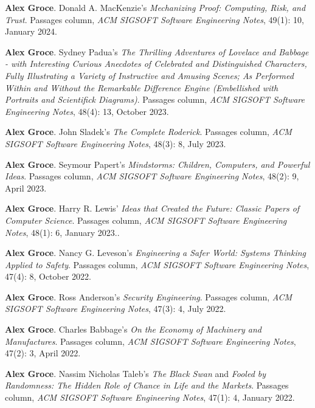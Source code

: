 \documentclass[ComputerScience]{vita}
\begin{document}
\begin{vita}
\begin{Columns, Book Reviews, and Magazine Articles}
\item {\bf Alex Groce}.
  \newblock Donald A. MacKenzie's \emph{Mechanizing Proof: Computing, Risk, and Trust}.
  \newblock Passages column, \emph{ACM SIGSOFT Software Engineering 
  Notes}, 49(1): 10, January 2024.
  
\item {\bf Alex Groce}.
  \newblock Sydney Padua's \emph{The Thrilling Adventures of Lovelace and Babbage - with Interesting Curious Anecdotes of Celebrated and Distinguished Characters, Fully Illustrating a Variety of Instructive and Amusing Scenes; As Performed Within and Without the Remarkable Difference Engine (Embellished with Portraits and Scientifick Diagrams)}.
  \newblock Passages column, \emph{ACM SIGSOFT Software Engineering 
  Notes}, 48(4): 13, October 2023.
  
\item {\bf Alex Groce}.
  \newblock John Sladek's \emph{The Complete Roderick}.
  \newblock Passages column, \emph{ACM SIGSOFT Software Engineering 
  Notes}, 48(3): 8, July 2023.

\item {\bf Alex Groce}. 
\newblock Seymour Papert's \emph{Mindstorms: Children, Computers, and Powerful Ideas}.
\newblock Passages column, \emph{ACM SIGSOFT Software Engineering 
  Notes}, 48(2): 9, April 2023.
  
\item {\bf Alex Groce}. 
\newblock Harry R. Lewis' \emph{Ideas that Created the Future: Classic Papers of Computer Science}.
\newblock Passages column, \emph{ACM SIGSOFT Software Engineering 
  Notes}, 48(1): 6, January 2023..
  
\item {\bf Alex Groce}. 
\newblock Nancy G. Leveson's \emph{Engineering a Safer World: Systems Thinking Applied to Safety}. 
\newblock Passages column, \emph{ACM SIGSOFT Software Engineering 
  Notes}, 47(4): 8, October 2022.
  
\item {\bf Alex Groce}. 
\newblock Ross Anderson's \emph{Security Engineering}. 
\newblock Passages column, \emph{ACM SIGSOFT Software Engineering 
  Notes}, 47(3): 4, July 2022.
  
\item {\bf Alex Groce}. 
\newblock Charles Babbage's \emph{On the Economy of Machinery and Manufactures}. 
\newblock Passages column, \emph{ACM SIGSOFT Software Engineering 
  Notes}, 47(2): 3, April 2022.
  
\item {\bf Alex Groce}. 
\newblock Nassim Nicholas Taleb’s \emph{The Black Swan} and \emph{Fooled by Randomness: The Hidden Role of Chance in Life and the Markets}. 
\newblock Passages column, \emph{ACM SIGSOFT Software Engineering 
  Notes}, 47(1): 4, January 2022.


\end{Columns, Book Reviews, and Magazine Articles}
\end{vita}
\end{document}
